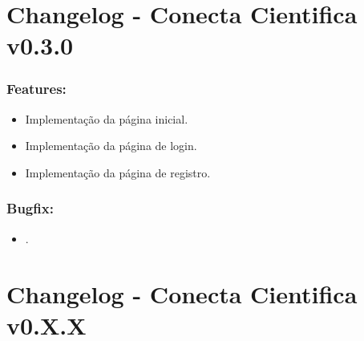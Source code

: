 \documentclass[
40pt,				%
openright,			%
oneside,			%
a4paper,			%
chapter=TITLE,		%
sumario=tradicional,
english,			%
]{abntex2}
\begin{document}
	
	
	\frenchspacing 
	
	\pretextual
	
	\textual
	\pagestyle{meuestilo}
	
	\chapter*{Changelog - Conecta Cientifica v0.3.0} 
	
	\subsection*{\textbf{Features:}}
	\begin{itemize} \setlength\itemsep{0em}
		
		\item Implementação da página inicial.
		\item Implementação da página de login.
		\item Implementação da página de registro.

	\end{itemize}

	\subsection*{\textbf{Bugfix:}}
	\begin{itemize} \setlength\itemsep{0em}

		\item .

	\end{itemize}


	

	\chapter*{Changelog - Conecta Cientifica v0.X.X} 
	
\end{document}
